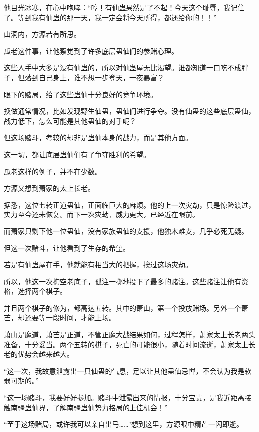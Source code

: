 \begin{this_body}
他目光冰寒，在心中咆哮：“哼！有仙蛊果然是了不起！今天这个耻辱，我记住了。等到我有仙蛊的那一天，我一定会将今天所得，都还给你的！！”

山洞内，方源若有所思。

瓜老这件事，让他察觉到了许多底层蛊仙们的参赌心理。

这些人手中大多是没有仙蛊的，所以对仙蛊屋无比渴望。谁都知道一口吃不成胖子，但落到自己身上，谁不想一步登天，一夜暴富？

眼下的赌局，给了这些蛊仙十分良好的竞争环境。

换做通常情况，比如发现野生仙蛊，蛊仙们进行争夺。没有仙蛊的这些底层蛊仙，战力低下，怎么可能是其他蛊仙的对手呢？

但这场赌斗，考较的却非是蛊仙本身的战力，而是其他方面。

这一切，都让底层蛊仙们有了争夺胜利的希望。

瓜老这样的例子，并不在少数。

方源又想到萧家的太上长老。

据悉，这位七转正道蛊仙，正面临巨大的麻烦。他的上一次灾劫，只是惊险渡过，实力至今还未恢复。而下一次灾劫，威力更大，已经近在眼前。

而萧家只剩下他一位蛊仙，没有家族蛊仙的支援，他独木难支，几乎必死无疑。

但这一次赌斗，让他看到了生存的希望。

若是有仙蛊屋在手，他就能有相当大的把握，挨过这场灾劫。

所以，他这一次掏空老底子，孤注一掷地投下了最多的赌注。这些赌注让他有资格，选择两个棋子。

并且两个棋子的修为，都高达五转。其中的萧山，第一个投放赌场。另外一个萧芒，却还要等一段时间，才能上场。

萧山是魔道，萧芒是正道，不管正魔大战结果如何，过程怎样，萧家太上长老两头准备，十分妥当。两个五转的棋子，死亡的可能很小，随着时间流逝，萧家太上长老的优势会越来越大。

“这一次，我故意泄露出一只仙蛊的气息，足以让其他蛊仙忌惮，不会认为我是软弱可期的。”

“这一场赌斗，我要好好参加。赌斗中泄露出来的情报，十分宝贵，是我近距离接触南疆蛊仙界，了解南疆蛊仙势力格局的上佳机会！”

“至于这场赌局，或许我可以亲自出马……”想到这里，方源眼中精芒一闪即逝。

\end{this_body}

